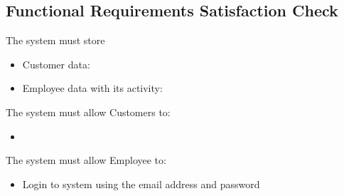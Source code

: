 \subsection{Functional Requirements Satisfaction Check}

The system must store
\begin{itemize}
	\item Customer data:
\end{itemize}
\begin{itemize}
	\item Employee data with its activity:
\end{itemize}

The system must allow Customers to:
\begin{itemize}
	\item
\end{itemize}

The system must allow Employee to:
\begin{itemize}
	\item Login to system using the email address and password
\end{itemize}